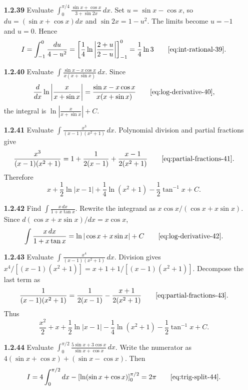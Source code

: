 \begin{enumerate}[label={},leftmargin=0pt]
\begin{enumerate}[label={},leftmargin=4mm,itemsep=9pt]
\setcounter{enumii}{39}
\setcounter{equation}{0}
\item[\textbf{1.2.39}] Evaluate $\displaystyle\int_0^{\pi/4}\frac{\sin x+\cos x}{3+\sin2x}\,dx$.
\solution Set $u=\sin x-\cos x$, so $du=(\sin x+\cos x)dx$ and $\sin2x=1-u^2$. The limits become $u=-1$ and $u=0$. Hence
\[
I=\int_{-1}^{0}\frac{du}{4-u^2}=\left[\frac14\ln\left|\frac{2+u}{2-u}\right|\right]_{-1}^{0}=\frac14\ln3\qquad\eqref{eq:int-rational-39}.
\]

\setcounter{enumii}{40}
\setcounter{equation}{0}
\item[\textbf{1.2.40}] Evaluate $\displaystyle\int\frac{\sin x-x\cos x}{x(x+\sin x)}\,dx$.
\solution Since
\[
\frac{d}{dx}\ln\left|\frac{x}{x+\sin x}\right|=\frac{\sin x-x\cos x}{x(x+\sin x)}\qquad\eqref{eq:log-derivative-40},
\]
the integral is $\ln\left|\frac{x}{x+\sin x}\right|+C$.

\setcounter{enumii}{41}
\setcounter{equation}{0}
\item[\textbf{1.2.41}] Evaluate $\displaystyle\int\frac{x^3}{(x-1)(x^2+1)}\,dx$.
\solution Polynomial division and partial fractions give
\[
\frac{x^3}{(x-1)(x^2+1)}=1+\frac1{2(x-1)}+\frac{x-1}{2(x^2+1)}\qquad\eqref{eq:partial-fractions-41}.
\]
Therefore
\[
x+\frac12\ln|x-1|+\frac14\ln(x^2+1)-\frac12\tan^{-1}x+C.
\]

\setcounter{enumii}{42}
\setcounter{equation}{0}
\item[\textbf{1.2.42}] Find $\displaystyle\int\frac{x\,dx}{1+x\tan x}$.
\solution Rewrite the integrand as $x\cos x/(\cos x+x\sin x)$. Since $d(\cos x+x\sin x)/dx=x\cos x$,
\[
\int\frac{x\,dx}{1+x\tan x}=\ln|\cos x+x\sin x|+C\qquad\eqref{eq:log-derivative-42}.
\]

\setcounter{enumii}{43}
\setcounter{equation}{0}
\item[\textbf{1.2.43}] Evaluate $\displaystyle\int\frac{x^4}{(x-1)(x^2+1)}\,dx$.
\solution Division gives $x^4/[(x-1)(x^2+1)]=x+1+1/[(x-1)(x^2+1)]$. Decompose the last term as
\[
\frac1{(x-1)(x^2+1)}=\frac1{2(x-1)}-\frac{x+1}{2(x^2+1)}\qquad\eqref{eq:partial-fractions-43}.
\]
Thus
\[
\frac{x^2}{2}+x+\frac12\ln|x-1|-\frac14\ln(x^2+1)-\frac12\tan^{-1}x+C.
\]

\setcounter{enumii}{44}
\setcounter{equation}{0}
\item[\textbf{1.2.44}] Evaluate $\displaystyle\int_0^{\pi/2}\frac{5\sin x+3\cos x}{\sin x+\cos x}\,dx$.
\solution Write the numerator as $4(\sin x+\cos x)+(\sin x-\cos x)$. Then
\[
I=4\int_0^{\pi/2}dx-\left[\ln(\sin x+\cos x)\right]_0^{\pi/2}=2\pi\qquad\eqref{eq:trig-split-44}.
\]


\end{enumerate}
\end{enumerate}
